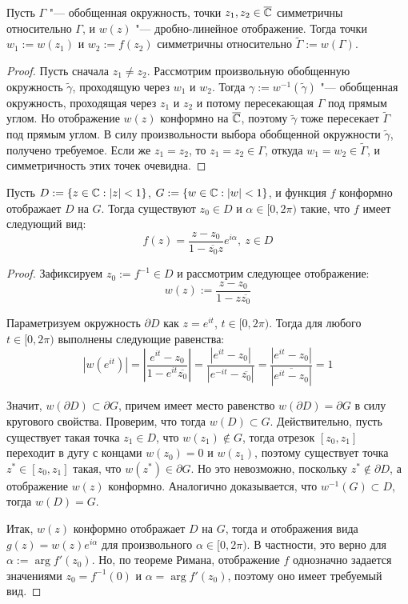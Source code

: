 \begin{proposition}
	Пусть $\Gamma$ "--- обобщенная окружность, точки $z_1, z_2 \in \overline{\mathbb{C}}$ симметричны относительно $\Gamma$, и $w(z)$ "--- дробно-линейное отображение. Тогда точки $w_1 := w(z_1)$ и $w_2  := f(z_2)$ симметричны относительно $\widetilde\Gamma := w(\Gamma)$.
\end{proposition}

\begin{proof}
	Пусть сначала $z_1 \ne z_2$. Рассмотрим произвольную обобщенную окружность $\widetilde{\gamma}$, проходящую через $w_1$ и $w_2$. Тогда $\gamma := w^{-1}(\widetilde\gamma)$ "--- обобщенная окружность, проходящая через $z_1$ и $z_2$ и потому пересекающая $\Gamma$ под прямым углом. Но отображение $w(z)$ конформно на $\overline{\mathbb{C}}$, поэтому $\widetilde \gamma$ тоже пересекает $\widetilde \Gamma$ под прямым углом. В силу произвольности выбора обобщенной окружности $\widetilde\gamma$, получено требуемое. Если же $z_1 = z_2$, то $z_1 = z_2 \in \Gamma$, откуда $w_1 = w_2 \in \widetilde\Gamma$, и симметричность этих точек очевидна.
\end{proof}

\begin{proposition}
	Пусть $D := \{z \in \mathbb{C}: |z| < 1\}$, $G := \{w \in \mathbb{C}: |w| < 1\}$, и функция $f$ конформно отображает $D$ на $G$. Тогда существуют $z_0 \in D$ и $\alpha \in [0, 2\pi)$ такие, что $f$ имеет следующий вид:
	\[f(z) = \frac{z - z_0}{1 - \overline{z_0}z}e^{i\alpha},~z \in D\]
\end{proposition}

\begin{proof}
	Зафиксируем $z_0 := f^{-1} \in D$ и рассмотрим следующее отображение:
	\[w(z) := \frac{z - z_0}{1 - z\overline{z_0}}\]
	
	Параметризуем окружность $\partial D$ как $z = e^{it}$, $t \in [0, 2\pi)$. Тогда для любого $t \in [0, 2\pi)$ выполнены следующие равенства:
	\[\left|w\left(e^{it}\right)\right| = \left|\frac{e^{it} - z_0}{1 - e^{it}\overline{z_0}}\right| = \frac{|e^{it} - z_0|}{|e^{-it} - \overline{z_0}|} = \frac{|e^{it} - z_0|}{|\overline{e^{it} - z_0}|} = 1\]
	
	Значит, $w(\partial D) \subset \partial G$, причем имеет место равенство  $w(\partial D) = \partial G$ в силу кругового свойства. Проверим, что тогда $w(D) \subset G$. Действительно, пусть существует такая точка $z_1 \in D$, что $w(z_1) \not\in G$, тогда отрезок $[z_0, z_1]$ переходит в дугу с концами $w(z_0) = 0$ и $w(z_1)$, поэтому существует точка $z^* \in [z_0, z_1]$ такая, что $w(z^*) \in \partial G$. Но это невозможно, поскольку $z^* \not \in \partial D$, а отображение $w(z)$ конформно. Аналогично доказывается, что $w^{-1}(G) \subset D$, тогда $w(D) = G$.
	
	Итак, $w(z)$ конформно отображает $D$ на $G$, тогда и отображения вида $g(z) = w(z)e^{i\alpha}$ для произвольного $\alpha \in [0, 2\pi)$. В частности, это верно для $\alpha := \arg{f'(z_0)}$. Но, по теореме Римана, отображение $f$ однозначно задается значениями $z_0 = f^{-1}(0)$ и $\alpha = \arg{f'(z_0)}$, поэтому оно имеет требуемый вид.
\end{proof}

